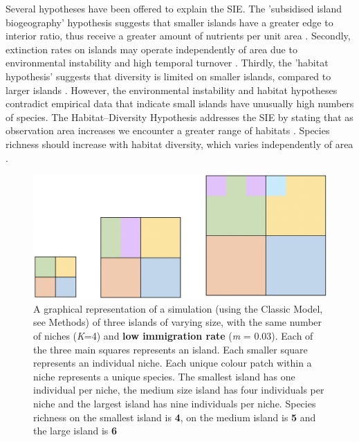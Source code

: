\noindent Several hypotheses have been offered to explain the SIE. The 'subsidised island biogeography' hypothesis suggests that smaller islands have a greater edge to interior ratio, thus receive a greater amount of nutrients per unit area \cite{barrett2003small} \cite{anderson2001subsidized}. Secondly, extinction rates on islands may operate independently of area due to environmental instability and high temporal turnover \cite{MacArthurRobertH1967Ttoi}. Thirdly, the 'habitat hypothesis' suggests that diversity is limited on smaller islands, compared to larger islands \cite{triantis2008evolutionary}. However, the environmental instability and habitat hypotheses contradict empirical data that indicate small islands have unusually high numbers of species. The Habitat--Diversity Hypothesis addresses the SIE by stating that as observation area increases we encounter a greater range of habitats \cite{EdwardF.Connor1979TSaB}. Species richness should increase with habitat diversity, which varies independently of area \cite{macdonald2018theory}.  \\

\begin{figure}[htp]

\centering
\includegraphics[width=.5\textwidth]{LowImIslands.png}\hfill

\caption{A graphical representation of a simulation (using the Classic Model, see Methods) of three islands of varying size, with the same number of niches (\textit{K}=4) and \textbf{low immigration rate} (\textit{m} = 0.03). Each of the three main squares represents an island. Each smaller square represents an individual niche. Each unique colour patch within a niche represents a unique species. The smallest island has one individual per niche, the medium size island has four individuals per niche and the largest island has nine individuals per niche. Species richness on the smallest island is \textbf{4}, on the medium island is \textbf{5} and the large island is \textbf{6}}
\label{fig:figure2}

\end{figure}

